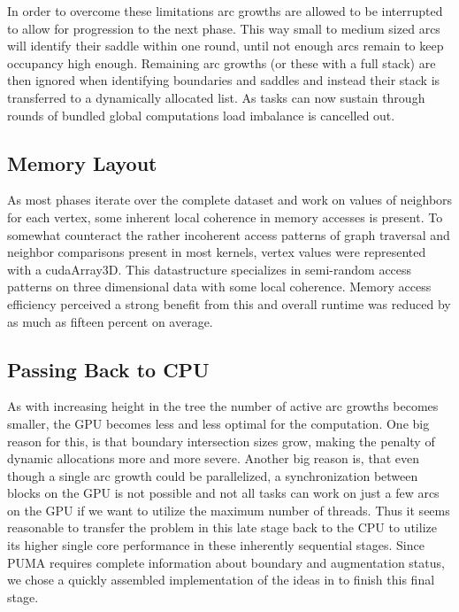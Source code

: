 \documentclass{scrartcl}
\begin{document}
In order to overcome these limitations arc growths are allowed to be interrupted to allow for progression to the next phase. This way small to medium sized arcs will identify their saddle within one round, until not enough arcs remain to keep occupancy high enough. Remaining arc growths (or these with a full stack) are then ignored when identifying boundaries and saddles and instead their stack is transferred to a dynamically allocated list. As tasks can now sustain through rounds of bundled global computations load imbalance is cancelled out. 

\subsection{Memory Layout}
As most phases iterate over the complete dataset and work on values of neighbors for each vertex, some inherent local coherence in memory accesses is present. To somewhat counteract the rather incoherent access patterns of graph traversal and neighbor comparisons present in most kernels, vertex values were represented with a cudaArray3D. This datastructure specializes in semi-random access patterns on three dimensional data with some local coherence. Memory access efficiency perceived a strong benefit from this and overall runtime was reduced by as much as fifteen percent on average. 

\subsection{Passing Back to CPU}
As with increasing height in the tree the number of active arc growths becomes smaller, the GPU becomes less and less optimal for the computation. One big reason for this, is that boundary intersection sizes grow, making the penalty of dynamic allocations more and more severe. Another big reason is, that even though a single arc growth could be parallelized, a synchronization between blocks on the GPU is not possible and not all tasks can work on just a few arcs on the GPU if we want to utilize the maximum number of threads. Thus it seems reasonable to transfer the problem in this late stage back to the CPU to utilize its higher single core performance in these inherently sequential stages. Since PUMA requires complete information about boundary and augmentation status, we chose a quickly assembled implementation of the ideas in \cite{FTM} to finish this final stage. 
\end{document}
